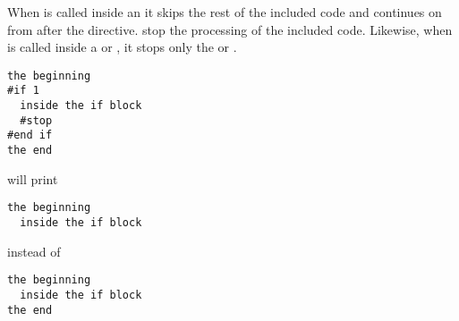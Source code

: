 When  is called inside an  it skips the rest of
the included code and continues on from after the  directive.
stop the processing of the included code.  Likewise, when  is
called inside a  or , it stops only the 
or .

\begin{verbatim}
the beginning
#if 1
  inside the if block
  #stop
#end if
the end
\end{verbatim}

will print 
\begin{verbatim}
the beginning
  inside the if block
\end{verbatim}

instead of 
\begin{verbatim}
the beginning
  inside the if block
the end
\end{verbatim}



